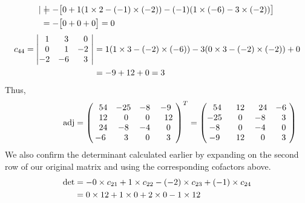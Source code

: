 \documentclass[12pt]{amsart}
\begin{document}
\begin{enumerate}
\begin{enumerate}
\begin{align}
\begin{vmatrix}
				\end{vmatrix}&=-\big[0+1(1\times2-(-1)\times(-2))-(-1)(1\times(-6)-3\times(-2))\big] \notag \\
				&=-\big[0+0+0\big]=0 \notag 
			\end{align}
			\begin{align}
			c_{44}=
				\begin{vmatrix}
					\text{ } \text{ }1 &\text{ } \text{ }3 &\text{ } \text{ }0 \text{ } \\
					\text{ } \text{ }0 &\text{ } \text{ }1 &-2 \text{ } \\
					-2 &-6 &\text{ } \text{ }3 \text{ } \\
				\end{vmatrix}&=1(1\times3-(-2)\times(-6))-3(0\times3-(-2)\times(-2))+0 \notag \\
				&=-9+12+0=3 \notag
			\end{align}
			Thus,
			\begin{align}
			\hspace{1.9cm} \text{adj}=
				\begin{pmatrix}
					\text{ } \text{ }54 &-25 &-8 &-9 \text{ } \\
					\text{ } \text{ }12 &\text{ } \text{ }0 &\text{ } \text{ }0 &\text{ } \text{ }12 \text{ } \\
					\text{ } \text{ }24 &-8 &-4 &\text{ } \text{ }0 \text{ } \\
					-6 &\text{ } \text{ }3 &\text{ } \text{ }0 &\text{ } \text{ }3 \text{ } 
				\end{pmatrix}^T=
				\begin{pmatrix}
					\text{ } \text{ }54 &\text{ } \text{ }12 &\text{ } \text{ }24 &-6 \text{ } \\
					-25 &\text{ } \text{ }0 &-8 &\text{ } \text{ }3 \text{ } \\
					-8 &\text{ } \text{ }0 &-4 &\text{ } \text{ }0 \text{ } \\
					-9 &\text{ } \text{ }12 &\text{ } \text{ }0 &\text{ } \text{ }3 \text{ } 
				\end{pmatrix} \notag
			\end{align}
			We also confirm the determinant calculated earlier by expanding on the second row of our 				original matrix and using the corresponding cofactors above.
			\smallskip
			\begin{align}
				\det &=-0\times c_{21}+1\times c_{22}-(-2)\times c_{23}+(-1)\times c_{24} \notag \\
				&=0\times12+1\times0+2\times0-1\times12 \notag \\

\end{align}
\end{enumerate}
\end{enumerate}
\end{document}
